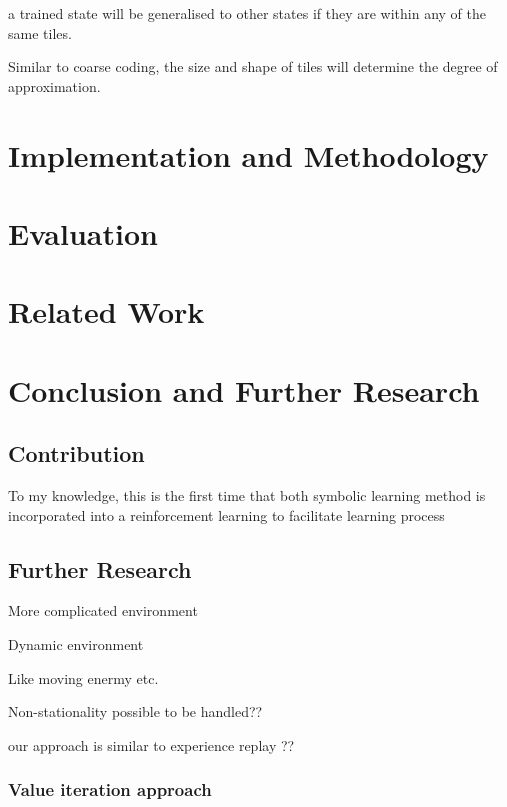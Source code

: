 \documentclass[12pt,twoside]{report}
\theoremstyle{plain}
\theoremstyle{definition}
\begin{document}
a trained state will be generalised to other states if they are within any of the same tiles. 

Similar to coarse coding, the size and shape of tiles will determine the degree of approximation. 

\chapter{Implementation and Methodology}
\label{methods}



\chapter{Evaluation}
\label{evaluation}


\chapter{Related Work}
\label{related_work}



\chapter{Conclusion and Further Research}
\label{conclusion_further_research}

\section{Contribution}
\label{contribution}

 To my knowledge, this is the first time that both symbolic learning method is incorporated into a reinforcement learning to facilitate learning process

\section{Further Research}
\label{further_research}

More complicated environment

Dynamic environment 

Like moving enermy etc.

Non-stationality possible to be handled??

our approach is similar to experience replay ??


\subsection{Value iteration approach}
\end{document}
